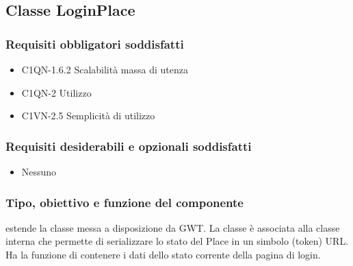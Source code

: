 \subsection{Classe LoginPlace}
\subsubsection*{Requisiti obbligatori soddisfatti}
\begin{itemize}
	\item C1QN-1.6.2 Scalabilit\`a massa di utenza
	\item C1QN-2 Utilizzo
	\item C1VN-2.5 Semplicit\`a di utilizzo
\end{itemize}
\subsubsection*{Requisiti desiderabili e opzionali soddisfatti}
\begin{itemize}
    \item Nessuno
\end{itemize}
\subsubsection*{Tipo, obiettivo e funzione del componente}
 estende la classe  messa a disposizione da GWT. La
classe \`e associata alla classe interna  che permette di
serializzare lo stato del Place in un simbolo (token) URL.
Ha la funzione di contenere i dati dello stato corrente della pagina di login.
